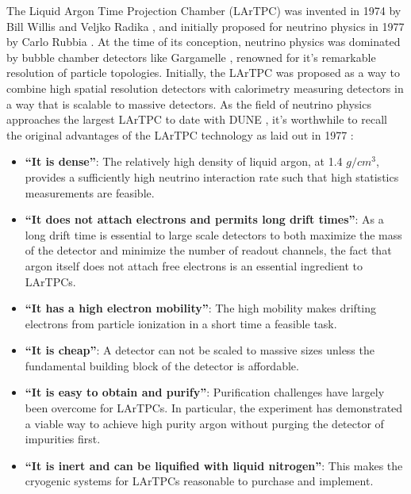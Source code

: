 The Liquid Argon Time Projection Chamber (LArTPC) was invented in 1974 by Bill Willis and Veljko Radika \cite{Willis:1974gi}, and initially proposed for neutrino physics in 1977 by Carlo Rubbia \cite{Rubbia:1977zz}.  At the time of its conception, neutrino physics was dominated by bubble chamber detectors like Gargamelle \cite{Musset:1978gf}, renowned for it's remarkable resolution of particle topologies.  Initially, the LArTPC was proposed as a way to combine high spatial resolution detectors with calorimetry measuring detectors in a way that is scalable to massive detectors.  As the field of neutrino physics approaches the largest LArTPC to date with DUNE \cite{DUNE}, it's worthwhile to recall the original advantages of the LArTPC technology as laid out in 1977 \cite{Rubbia:1977zz}:

\begin{itemize}

\item{\bf ``It is dense''}: The relatively high density of liquid argon, at 1.4 $g/cm^3$, provides a sufficiently high neutrino interaction rate such that high statistics measurements are feasible.

\item{\bf ``It does not attach electrons and permits long drift times''}: As a long drift time is essential to large scale detectors to both maximize the mass of the detector and minimize the number of readout channels, the fact that argon itself does not attach free electrons is an essential ingredient to LArTPCs.

\item{\bf ``It has a high electron mobility''}: The high mobility makes drifting electrons from particle ionization in a short time a feasible task.

\item{\bf ``It is cheap''}:  A detector can not be scaled to massive sizes unless the fundamental building block of the detector is affordable.

\item{\bf ``It is easy to obtain and purify''}: Purification challenges have largely been overcome for LArTPCs.  In particular, the \uboone experiment has demonstrated a viable way to achieve high purity argon without purging the detector of impurities first.

\item{\bf ``It is inert and can be liquified with liquid nitrogen''}: This makes the cryogenic systems for LArTPCs reasonable to purchase and implement.

\end{itemize}

